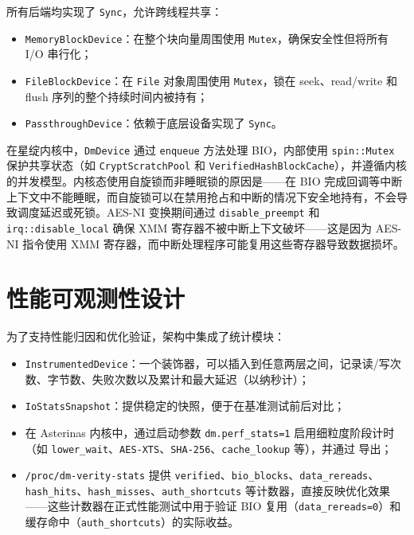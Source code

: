 所有后端均实现了 \texttt{Sync}，允许跨线程共享：

\begin{itemize}
    \item \texttt{MemoryBlockDevice}：在整个块向量周围使用 \texttt{Mutex}，确保安全性但将所有 I/O 串行化；
    \item \texttt{FileBlockDevice}：在 \texttt{File} 对象周围使用 \texttt{Mutex}，锁在 seek、read/write 和 flush 序列的整个持续时间内被持有；
    \item \texttt{PassthroughDevice}：依赖于底层设备实现了 \texttt{Sync}。
\end{itemize}

在星绽内核中，\texttt{DmDevice} 通过 \texttt{enqueue} 方法处理 BIO，内部使用 \texttt{spin::Mutex} 保护共享状态（如 \texttt{CryptScratchPool} 和 \texttt{VerifiedHashBlockCache}），并遵循内核的并发模型。内核态使用自旋锁而非睡眠锁的原因是——在 BIO 完成回调等中断上下文中不能睡眠，而自旋锁可以在禁用抢占和中断的情况下安全地持有，不会导致调度延迟或死锁。AES-NI 变换期间通过 \texttt{disable\_preempt} 和 \texttt{irq::disable\_local} 确保 XMM 寄存器不被中断上下文破坏——这是因为 AES-NI 指令使用 XMM 寄存器，而中断处理程序可能复用这些寄存器导致数据损坏。

\section{性能可观测性设计}

为了支持性能归因和优化验证，架构中集成了统计模块：

\begin{itemize}
    \item \texttt{InstrumentedDevice}：一个装饰器，可以插入到任意两层之间，记录读/写次数、字节数、失败次数以及累计和最大延迟（以纳秒计）；
    \item \texttt{IoStatsSnapshot}：提供稳定的快照，便于在基准测试前后对比；
    \item 在 Asterinas 内核中，通过启动参数 \texttt{dm.perf\_stats=1} 启用细粒度阶段计时（如 \texttt{lower\_wait}、\texttt{AES-XTS}、\texttt{SHA-256}、\texttt{cache\_lookup} 等），并通过 \texttt{} 导出；
    \item \texttt{/proc/dm-verity-stats} 提供 \texttt{verified}、\texttt{bio\_blocks}、\texttt{data\_rereads}、\texttt{hash\_hits}、\texttt{hash\_misses}、\texttt{auth\_shortcuts} 等计数器，直接反映优化效果——这些计数器在正式性能测试中用于验证 BIO 复用（\texttt{data\_rereads=0}）和缓存命中（\texttt{auth\_shortcuts}）的实际收益。
\end{itemize}

